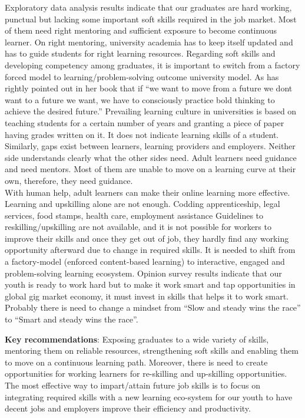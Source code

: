 \documentclass[
]{aft}
\begin{document}
Exploratory data analysis results indicate that our graduates are hard
working, punctual but lacking some important soft skills required in the
job market. Most of them need right mentoring and sufficient exposure to
become continuous learner. On right mentoring, university academia has
to keep itself updated and has to guide students for right learning
resources. Regarding soft skills and developing competency among
graduates, it is important to switch from a factory forced model to
learning/problem-solving outcome university model. As \citet{Weise2020}
has rightly pointed out in her book that if ``we want to move from a
future we dont want to a future we want, we have to consciously practice
bold thinking to achieve the desired future.'' Prevailing learning
culture in universities is based on teaching students for a certain
number of years and granting a piece of paper having grades written on
it. It does not indicate learning skills of a student. Similarly, gaps
exist between learners, learning providers and employers. Neither side
understands clearly what the other sides need. Adult learners need
guidance and need mentors. Most of them are unable to move on a learning
curve at their own, therefore, they need guidance.\\
With human help, adult learners can make their online learning more
effective. Learning and upskilling alone are not enough. Codding
apprenticeship, legal services, food stamps, health care, employment
assistance Guidelines to reskilling/upskilling are not available, and it
is not possible for workers to improve their skills and once they get
out of job, they hardly find any working opportunity afterward due to
change in required skills. It is needed to shift from a factory-model
(enforced content-based learning) to interactive, engaged and
problem-solving learning ecosystem. Opinion survey results indicate that
our youth is ready to work hard but to make it work smart and tap
opportunities in global gig market economy, it must invest in skills
that helps it to work smart. Probably there is need to change a mindset
from ``Slow and steady wins the race'' to ``Smart and steady wins the
race''.

\textbf{Key recommendations}: Exposing graduates to a wide variety of
skills, mentoring them on reliable resources, strengthening soft skills
and enabling them to move on a continuous learning path. Moreover, there
is need to create opportunities for working learners for re-skilling and
up-skilling opportunities. The most effective way to impart/attain
future job skills is to focus on integrating required skills with a new
learning eco-system for our youth to have decent jobs and employers
improve their efficiency and productivity.
\end{document}
